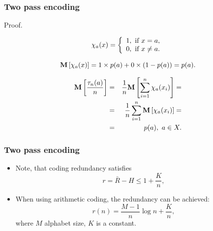 \documentclass[14pt]{beamer}
\begin{document}
\begin{frame}
\frametitle{Two pass encoding}
Proof.
\begin{itemize}    
\small{
       
    \item 
    \[
    \chi _a (x) = \left\{ {{\begin{array}{*{20}c}
     {1,\mbox{ if }x = a,} \hfill \\
     {0,\mbox{ if }x \ne a.} \hfill \\
    \end{array} }} \right.
    \]
    
    \item 
    \[
    {\rm {\bf M}}\left[ {\chi _a (x)} \right] = 1\times p(a) + 0\times
    (1 - p(a)) = p(a).
    \]
    
    \item 
    \begin{eqnarray*}
    {\rm {\bf M}}\left[ {\frac{\tau _n (a)}{n}} \right] &=&
    \frac{1}{n}{\rm {\bf M}}\left[ {\sum\limits_{i = 1}^n {\chi _a (x_i
    )} } \right] =\\
     &=& \frac{1}{n}\sum\limits_{i = 1}^n {{\rm {\bf M}}\left[ {\chi _a
    (x_i )} \right]} = \\
    &=& p(a),\mbox{ }a \in X.
    \end{eqnarray*}
}

\end{itemize}
\end{frame}


\begin{frame}
\frametitle{Two pass encoding}
\begin{itemize}    
    
    \item Note, that coding redundancy satisfies
    \begin{equation}
    \label{eq3_23} r = \bar {R} - H \le 1 + \frac{K}{n},
    \end{equation}
    
    \item When using arithmetic coding, the redundancy can be achieved:
    \begin{equation}
    \label{eq3_24}
     r(n)=\frac{M-1}{n} \log n +\frac
    {K}{n},
    \end{equation}
    where $M$ alphabet size, $K$ is a constant.
    
\end{itemize}
\end{frame}
\end{document}
